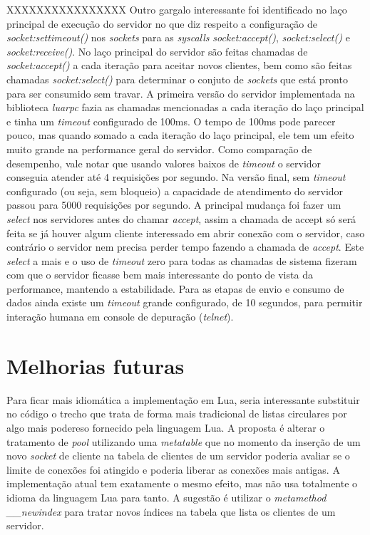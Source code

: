 \documentclass[11pt]{article}
\begin{document}
XXXXXXXXXXXXXXXX
Outro gargalo interessante foi identificado no laço principal de execução do
servidor no que diz respeito a configuração de \textit{socket:settimeout()} nos
\textit{sockets} para as \textit{syscalls} \textit{socket:accept()},
\textit{socket:select()} e \textit{socket:receive()}. No laço principal do
servidor são feitas chamadas de \textit{socket:accept()} a cada iteração para
aceitar novos clientes, bem como são feitas chamadas \textit{socket:select()}
para determinar o conjuto de \textit{sockets} que está pronto para ser consumido
sem travar. A primeira versão do servidor implementada na biblioteca
\textit{luarpc} fazia as chamadas mencionadas a cada iteração do laço principal
e tinha um \textit{timeout} configurado de 100ms. O tempo de 100ms pode parecer
pouco, mas quando somado a cada iteração do laço principal, ele tem um efeito
muito grande na performance geral do servidor. Como comparação de desempenho,
vale notar que usando valores baixos de \textit{timeout} o servidor conseguia
atender até 4 requisições por segundo. Na versão final, sem \textit{timeout}
configurado (ou seja, sem bloqueio) a capacidade de atendimento do servidor
passou para 5000 requisições por segundo. A principal mudança foi fazer um
\textit{select} nos servidores antes do chamar \textit{accept}, assim a chamada
de accept só será feita se já houver algum cliente interessado em abrir conexão
com o servidor, caso contrário o servidor nem precisa perder tempo fazendo a
chamada de \textit{accept}. Este \textit{select} a mais e o uso de
\textit{timeout} zero para todas as chamadas de sistema fizeram com que o
servidor ficasse bem mais interessante do ponto de vista da performance,
mantendo a estabilidade. Para as etapas de envio e consumo de dados ainda existe
um \textit{timeout} grande configurado, de 10 segundos, para permitir interação
humana em console de depuração (\textit{telnet}).

\section{Melhorias futuras}\label{sec:future}

Para ficar mais idiomática a implementação em Lua, seria interessante
substituir no código o trecho que trata de forma mais tradicional de listas
circulares por algo mais podereso fornecido pela linguagem Lua. A proposta é
alterar o tratamento de \textit{pool} utilizando uma
\textit{metatable}\cite{metat} que no momento da inserção de um novo
\textit{socket} de cliente na tabela de clientes de um servidor poderia avaliar
se o limite de conexões foi atingido e poderia liberar as conexões mais
antigas. A implementação atual tem exatamente o mesmo efeito, mas não usa
totalmente o idioma da linguagem Lua para tanto. A sugestão é utilizar o
\textit{metamethod} \textit{\_\_newindex} para tratar novos índices na tabela que
lista os clientes de um servidor.
\end{document}
